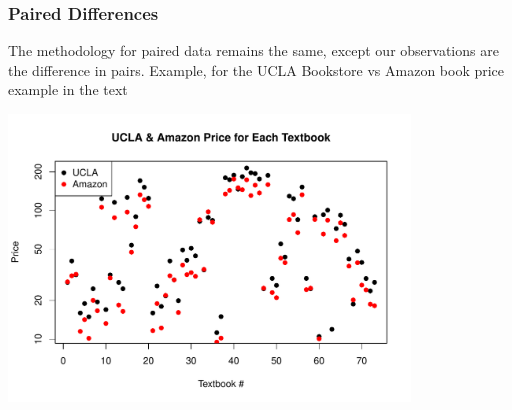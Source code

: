 \documentclass[slides]{beamer}
\newcommand{\blue}[1]{\textcolor{blue2}{#1}}
\begin{document}
%
%
\begin{frame}[fragile]
\frametitle{Paired Differences}
The methodology for paired data remains the same, except our \blue{observations} are the difference in pairs.  Example, for the UCLA Bookstore vs Amazon book price example in the text
\begin{center}
\includegraphics[width=0.8\textwidth]{figure/diff.pdf}
\end{center}


\end{frame}
\end{document}
